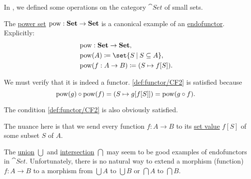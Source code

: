 \begin{example}\label{ex:unary_functors_in_set}
  In , we defined some operations on the category \hyperref[def:category_of_small_sets]{\( \cat{Set} \)} of small sets.

  \begin{thmenum}
     The \hyperref[def:basic_set_operations/power_set]{power set} \( \operatorname{pow}: \operatorname{\mathbf{Set}} \to \operatorname{\mathbf{Set}} \) is a canonical example of an \hyperref[def:functor/endofunctor]{endofunctor}. Explicitly:
    \begin{equation*}
      \begin{aligned}
        &\pow: \cat{Set} \to \cat{Set}, \\
        &\pow(A) \coloneqq \set{ S \given S \subseteq A }, \\
        &\pow(f: A \to B) \coloneqq (S \mapsto f[S]). \\
      \end{aligned}
    \end{equation*}

    We must verify that it is indeed a functor. \ref{def:functor/CF2} is satisfied because
    \begin{equation*}
      \pow(g) \bincirc \pow(f) = (S \mapsto g[f[S]]) = \pow(g \bincirc f).
    \end{equation*}

    The condition \ref{def:functor/CF2} is also obviously satisfied.

    The nuance here is that we send every function \( f: A \to B \) to its \hyperref[def:multi_valued_function/set_value]{set value} \( f[S] \) of some subset \( S \) of \( A \).

     The \hyperref[def:basic_set_operations/union]{union} \( \bigcup \) and \hyperref[def:basic_set_operations/intersection]{intersection} \( \bigcap \) may seem to be good examples of endofunctors in \( \cat{Set} \). Unfortunately, there is no natural way to extend a morphism (function) \( f: A \to B \) to a morphism from \( \bigcup A \) to \( \bigcup B \) or \( \bigcap A \) to \( \bigcap B \).
  \end{thmenum}
\end{example}


